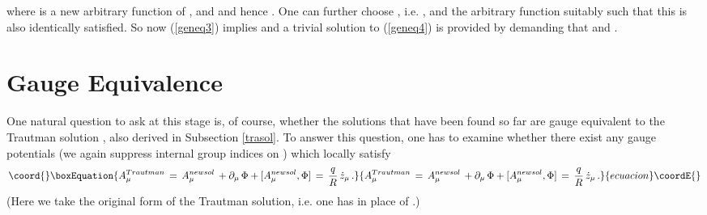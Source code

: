 \documentclass[a4paper,twocolumn,prd,showpacs,amsmath,amssymb]{revtex4}
\begin{document}
where \coordHE{} is a new arbitrary function of \myHighlight{$\tau$}\coordHE{}, and \coordHE{} and hence \coordHE{}.
One can further choose \coordHE{}, i.e. \coordHE{},
and the arbitrary function \coordHE{} suitably such that this is also identically satisfied.
So now (\ref{geneq3}) implies \coordHE{} and a trivial solution
to (\ref{geneq4}) is provided by demanding that \coordHE{} and
\coordHE{}.

\section{\label{gauge} Gauge Equivalence}

One natural question to ask at this stage is, of course, whether the solutions
that have been found so far are gauge equivalent to the Trautman
solution \cite{traut}, also derived in Subsection \ref{trasol}. To answer this
question, one has to examine whether there exist any gauge potentials \myHighlight{$\Phi$}\coordHE{}
(we again suppress internal group indices on \myHighlight{$\Phi$}\coordHE{}) which locally satisfy
\begin{equation}\coord{}\boxEquation{
A_{\mu}^{Trautman} \, = \, A_{\mu}^{new sol} \, + \partial_{\mu} \, \Phi +
[A_{\mu}^{new sol},\Phi] \, = \, \frac{q}{R} \, \dot{z}_{\mu} \, . \label{gau1}
}{
A_{\mu}^{Trautman} \, = \, A_{\mu}^{new sol} \, + \partial_{\mu} \, \Phi +
[A_{\mu}^{new sol},\Phi] \, = \, \frac{q}{R} \, \dot{z}_{\mu} \, . }{ecuacion}\coordE{}\end{equation}
(Here we take the original form of the Trautman solution, i.e. one has \coordHE{}
in place of \myHighlight{$\beta$}\coordHE{}.)
\end{document}
